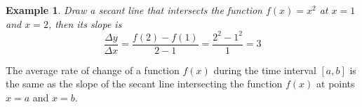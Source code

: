 \documentclass{article}
\newtheorem{ex}{Example}
\begin{document}
\begin{ex}
	Draw a secant line that intersects the function $f(x)=x^2$ at $x=1$ and $x=2$, then its slope is
	\[ \frac{\Delta y}{\Delta x} = \frac{f(2)-f(1)}{2-1} = \frac{2^2-1^2}{1} = 3 \]
\end{ex}

The average rate of change of a function $f(x)$ during the time interval $[a,b]$ is the same as the slope of the secant line intersecting the function $f(x)$ at points $x=a$ and $x=b$.
\end{document}

